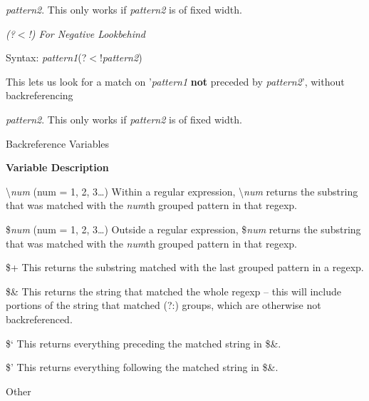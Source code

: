 \documentclass[a4paper,11pt]{book}
\begin{document}
\noindent \textit{pattern2}. This only works if \textit{pattern2 }is of fixed width.

\noindent 

\noindent \textit{(?$<$!) For Negative Lookbehind}

\noindent Syntax: \textit{pattern1}(?$<$!\textit{pattern2})

\noindent 

\noindent This lets us look for a match on '\textit{pattern1 }\textbf{not }preceded by \textit{pattern2}', without backreferencing

\noindent \textit{pattern2}. This only works if \textit{pattern2 }is of fixed width.

\noindent \eject 

\noindent 

\noindent 

\noindent Backreference Variables

\noindent 

\noindent \textbf{Variable Description}

\noindent 

\noindent \textbackslash \textit{num }(num = 1, 2, 3\dots ) Within a regular expression, \textbackslash \textit{num }returns the substring that was matched with the \textit{num}th grouped pattern in that regexp.

\noindent 

\noindent \$\textit{num }(num = 1, 2, 3\dots ) Outside a regular expression, \$\textit{num }returns the substring that was matched with the \textit{num}th grouped pattern in that regexp.

\noindent 

\noindent \$+ This returns the substring matched with the last grouped pattern in a regexp.

\noindent 

\noindent \$\& This returns the string that matched the whole regexp -- this will include portions of the string that matched (?:) groups, which are otherwise not backreferenced.

\noindent 

\noindent \$` This returns everything preceding the matched string in \$\&.

\noindent 

\noindent \$' This returns everything following the matched string in \$\&.

\noindent 

\noindent 

\noindent Other
\end{document}
